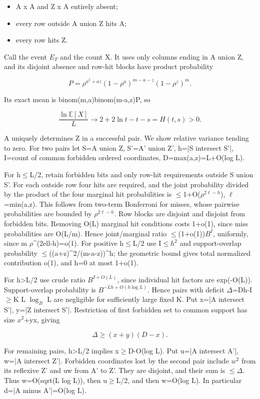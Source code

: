 \documentclass[11pt]{article}
\begin{document}
\begin{itemize}
\item A x A and Z x A entirely absent;
\item every row outside A union Z hits A;
\item every row hits Z.
\end{itemize}

Call the event $E_T$ and the count X. It uses only columns ending in A union Z, and its disjoint absence and row-hit blocks have product probability

\[
P=\rho^{a^2+az}(1-\rho^a)^{m-a-z}(1-\rho^z)^m.
\]

Its exact mean is binom(m,a)binom(m-a,z)P, so

\[
\frac{\ln\mathbb E[X]}{L}\longrightarrow2+2\ln t-t-s=H(t,s)>0.
\]

A uniquely determines Z in a successful pair. We show relative variance tending to zero. For two pairs let S=A union Z, S'=A' union Z', h=|S intersect S'|, I=count of common forbidden ordered coordinates, D=max(a,z)=L+O(log L).

For h\ensuremath{\leq}L/2, retain forbidden bits and only row-hit requirements outside S union S'. For each outside row four hits are required, and the joint probability divided by the product of the four marginal hit probabilities is \ensuremath{\leq}1+O($\rho^{2\ell-h}$), $\ell$=min(a,z). This follows from two-term Bonferroni for misses, whose pairwise probabilities are bounded by $\rho^{2\ell-h}$. Row blocks are disjoint and disjoint from forbidden bits. Removing O(L) marginal hit conditions costs 1+o(1), since miss probabilities are O(L/m). Hence joint/marginal ratio \ensuremath{\leq}(1+o(1))$B^{I}$, uniformly, since m $\rho$\textasciicircum{}(2ell-h)=o(1). For positive h\ensuremath{\leq}L/2 use I\ensuremath{\leq}$h^{2}$ and support-overlap probability \ensuremath{\leq}((a+z)\textasciicircum{}2/(m-a-z))\textasciicircum{}h; the geometric bound gives total normalized contribution o(1), and h=0 at most 1+o(1).

For h>L/2 use crude ratio $B^{I+O(L)}$, since individual hit factors are exp(-O(L)). Support-overlap probability is $B^{-Lh+O(h\log L)}$. Hence pairs with deficit $\Delta$=Dh-I\ensuremath{\geq}K L $\log_B$ L are negligible for sufficiently large fixed K. Put x=|A intersect S'|, y=|Z intersect S'|. Restriction of first forbidden set to common support has size $x^{2}$+yx, giving

\[
\Delta\geq(x+y)(D-x).
\]

For remaining pairs, h>L/2 implies x\ensuremath{\geq}D-O(log L). Put u=|A intersect A'|, w=|A intersect Z'|. Forbidden coordinates lost by the second pair include $w^{2}$ from its reflexive Z' and uw from A' to Z'. They are disjoint, and their sum is \ensuremath{\leq}$\Delta$. Thus w=O(sqrt(L log L)), then u\ensuremath{\geq}L/2, and then w=O(log L). In particular d=|A minus A'|=O(log L).
\end{document}
